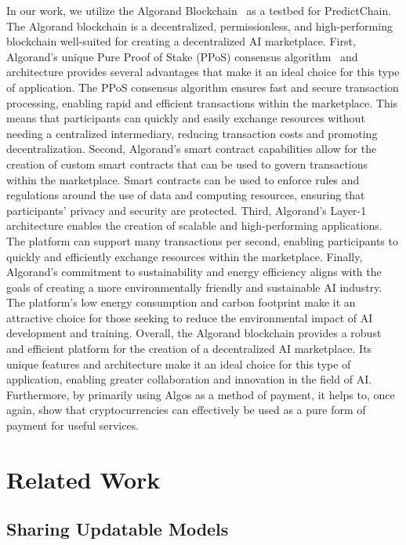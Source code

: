 \documentclass{ledger}
\begin{document}
In our work, we utilize the Algorand Blockchain~\cite{gilad2017algorand} as a testbed for PredictChain.  The Algorand
blockchain is a decentralized, permissionless, and high-performing blockchain well-suited for creating a decentralized
AI marketplace. First, Algorand's unique Pure Proof of Stake (PPoS) consensus algorithm~\cite{dimitri2022proof} and
architecture provides several advantages that make it an ideal choice for this type of application. The PPoS consensus
algorithm ensures fast and secure transaction processing, enabling rapid and efficient transactions within the marketplace.
This means that participants can quickly and easily exchange resources without needing a centralized intermediary,
reducing transaction costs and promoting decentralization.  Second, Algorand's smart contract capabilities allow for
the creation of custom smart contracts that can be used to govern transactions within the marketplace. Smart contracts
can be used to enforce rules and regulations around the use of data and computing resources, ensuring that participants'
privacy and security are protected.
Third, Algorand's Layer-1 architecture enables the creation of scalable and high-performing applications. The platform
can support many transactions per second, enabling participants to quickly and efficiently exchange resources within the
marketplace.  Finally, Algorand's commitment to sustainability and energy efficiency aligns with the goals of creating
a more environmentally friendly and sustainable AI industry. The platform's low energy consumption and carbon footprint
make it an attractive choice for those seeking to reduce the environmental impact of AI development and training.
Overall, the Algorand blockchain provides a robust and efficient platform for the creation of a decentralized AI
marketplace. Its unique features and architecture make it an ideal choice for this type of application, enabling greater
collaboration and innovation in the field of AI.
Furthermore, by primarily using Algos as a method of payment, it helps to, once again, show that cryptocurrencies can
effectively be used as a pure form of payment for useful services.

\section{Related Work}

\subsection{Sharing Updatable Models}
\end{document}
